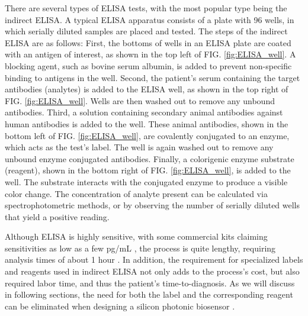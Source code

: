 \documentclass[aps,prl,twocolumn, superscriptaddress,nobalancelastpage]{revtex4}
\begin{document}
There are several types of ELISA tests, with the most popular type being the indirect ELISA. A typical ELISA apparatus consists of a plate with 96 wells, in which serially diluted samples are placed and tested. The steps of the indirect ELISA are as follows: First, the bottoms of wells in an ELISA plate are coated with an antigen of interest, as shown in the top left of FIG. \ref{fig:ELISA_well}. A blocking agent, such as bovine serum albumin, is added to prevent non-specific binding to antigens in the well. Second, the patient's serum containing the target antibodies (analytes) is added to the ELISA well, as shown in the top right of FIG. \ref{fig:ELISA_well}. Wells are then washed out to remove any unbound antibodies. Third, a solution containing secondary animal antibodies against human antibodies is added to the well. These animal antibodies, shown in the bottom left of FIG. \ref{fig:ELISA_well}, are covalently conjugated to an enzyme, which acts as the test's label. The well is again washed out to remove any unbound enzyme conjugated antibodies. Finally, a colorigenic enzyme substrate (reagent), shown in the bottom right of FIG. \ref{fig:ELISA_well}, is added to the well. The substrate interacts with the conjugated enzyme to produce a visible color change. The concentration of analyte present can be calculated via spectrophotometric methods, or by observing the number of serially diluted wells that yield a positive reading.

Although ELISA is highly sensitive, with some commercial kits claiming sensitivities as low as a few pg/mL \cite{ELISAlimit}, the process is quite lengthy, requiring analysis times of about 1 hour \cite{mechbiosensors}. In addition, the requirement for specialized labels and reagents used in indirect ELISA not only adds to the process's cost, but also required labor time, and thus the patient's time-to-diagnosis. As we will discuss in following sections, the need for both the label and the corresponding reagent can be eliminated when designing a silicon photonic biosensor \cite{labelfree}.

\pagebreak
\end{document}
